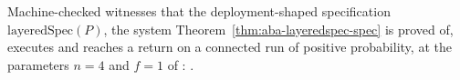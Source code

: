 \begin{definition}
  \label{def:aba-examples}
  \leanok
  Machine-checked witnesses that the deployment-shaped specification $\mathrm{layeredSpec}(P)$, the system Theorem~\ref{thm:aba-layeredspec-spec} is proved of, executes and reaches a return on a connected run of positive probability, at the parameters $n = 4$ and $f = 1$ of : .
\end{definition}
